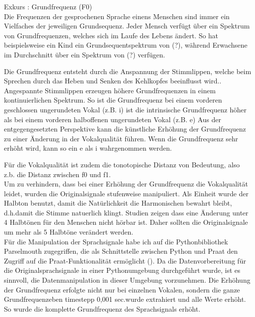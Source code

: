 \documentclass[11pt,a4paper,headsepline,twoside,toc=bibliography]{scrreprt}
\begin{document}
Exkurs : Grundfrequenz (F0)\\

Die Frequenzen der gesprochenen Sprache einens Menschen sind immer ein Vielfaches der jeweiligen Grundsequenz.
Jeder Mensch verfügt über ein Spektrum von Grundfrequenzen, welches sich im Laufe des Lebens ändert. So hat beispielsweise ein Kind ein Grundsequentspektrum von (?), während Erwachsene im Durchschnitt über ein Spektrum von (?) verfügen.

Die Grundfrequenz entsteht durch die Anspannung der Stimmlippen, welche beim Sprechen durch das Heben und Senken des Kehlkopfes beeinflusst wird..
Angespannte Stimmlippen erzeugen höhere Grundfrequenzen in einem kontinuierlichen Spektrum. So ist die Grundfrequenz bei einem vorderen geschlossen ungerundeten Vokal (z.B. i) ist die
intrinsische Grundfrequenz höher als bei einem vorderen halboffenen ungerundeten Vokal (z.B. e)
Aus der entgegengesetzten Perspektive kann die künstliche Erhöhung der Grundfrequenz zu einer
Änderung in der Vokalqualität führen. Wenn die Grundfrequenz sehr erhöht wird, kann so ein e als i wahrgenommen werden.

Für die Vokalqualität ist zudem die tonotopische Distanz von Bedeutung, also z.b. die
Distanz zwischen f0 und f1.\\

Um zu verhindern, dass bei einer Erhöhung der Grundfrequenz die Vokalqualität leidet, wurden die Originalsignale stufenweise manipuliert. Als Einheit wurde der Halbton benutzt, damit die
Natürlichkeit die Harmonischen bewahrt bleibt, d.h.damit die Stimme natuerlich klingt.
Studien zeigen dass eine Änderung unter 4 Halbtönen für den Menschen nicht hörbar ist. 
Daher sollten die Originalsignale um mehr als 5 Halbtöne verändert werden.\\

Für die Manipulation der Sprachsignale habe ich auf die Pythonbibliothek Parselmouth zugegriffen, die als
Schnittstelle zwischen Python und Praat den Zugriff auf die Praat-Funktionalität ermöglicht (\cite{Jadoul2018a}). Da die Datenvorbereitung für die Originalsprachsignale in einer Pythonumgebung durchgeführt wurde, ist es sinnvoll, die Datenmanipulation in dieser Umgebung vorzunehmen.
Die Erhöhung der Grundfrequenz erfolgte nicht nur bei einzelnen Vokalen, sondern die ganze Grundfrequenzeben timestepp 0,001 sec.wurde extrahiert und alle Werte erhöht. So wurde die komplette Grundfrequenz des Sprachsignals erhöht.\\
\end{document}
